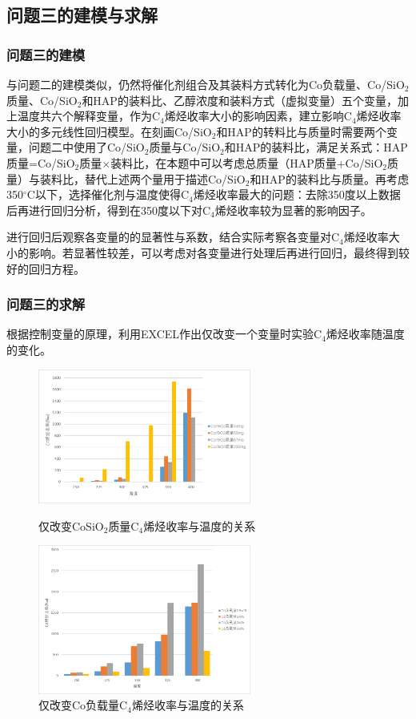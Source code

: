 \documentclass[a4paper,10.5pt]{ctexart}
\begin{document}
\subsection{问题三的建模与求解}
\subsubsection{问题三的建模}
与问题二的建模类似，仍然将催化剂组合及其装料方式转化为Co负载量、Co/SiO$_2$质量、Co/SiO$_2$和HAP的装料比、乙醇浓度和装料方式（虚拟变量）五个变量，加上温度共六个解释变量，作为C$_4$烯烃收率大小的影响因素，建立影响C$_4$烯烃收率大小的多元线性回归模型。在刻画Co/SiO$_2$和HAP的转料比与质量时需要两个变量，问题二中使用了Co/SiO$_2$质量与Co/SiO$_2$和HAP的装料比，满足关系式：HAP质量=Co/SiO$_2$质量$\times$装料比，在本题中可以考虑总质量（HAP质量+Co/SiO$_2$质量）与装料比，替代上述两个量用于描述Co/SiO$_2$和HAP的装料比与质量。再考虑350$^{\circ}$C以下，选择催化剂与温度使得C$_4$烯烃收率最大的问题：去除350度以上数据后再进行回归分析，得到在350度以下对C$_4$烯烃收率较为显著的影响因子。

进行回归后观察各变量的的显著性与系数，结合实际考察各变量对C$_4$烯烃收率大小的影响。若显著性较差，可以考虑对各变量进行处理后再进行回归，最终得到较好的回归方程。

\subsubsection{问题三的求解}
根据控制变量的原理，利用EXCEL作出仅改变一个变量时实验C$_4$烯烃收率随温度的变化。
\begin{figure}[h]
\centering
\begin{minipage}[t]{0.48\textwidth}
\centering
\includegraphics[width=7cm]{CoSiO2质量1wt1.68ml.png}
\caption{仅改变CoSiO$_2$质量C$_4$烯烃收率与温度的关系}
\end{minipage}
\begin{minipage}[t]{0.48\textwidth}
\centering
\includegraphics[width=7cm]{Co负载量1.68ml200400.png}
\caption{仅改变Co负载量C$_4$烯烃收率与温度的关系}
\end{minipage}
\end{figure}
\end{document}
